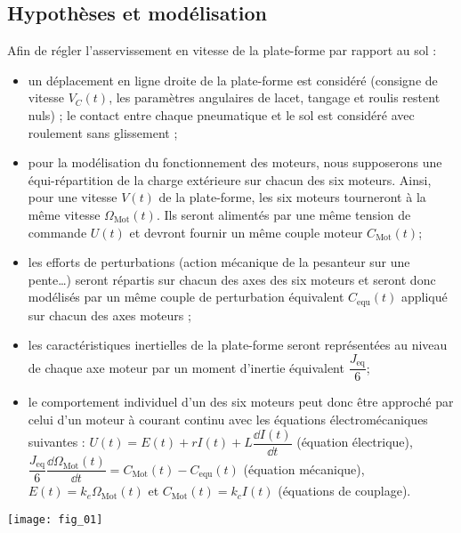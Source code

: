 \begin{multicols}{2}
\subsection*{Hypothèses et modélisation}
Afin de régler l’asservissement en vitesse de la plate-forme par rapport au sol :
\begin{itemize}
\item un déplacement en ligne droite de la plate-forme est considéré (consigne de vitesse $V_C(t)$, les paramètres
angulaires de lacet, tangage et roulis restent nuls) ;
le contact entre chaque pneumatique et le sol est considéré avec roulement sans glissement ;
\item pour la modélisation du fonctionnement des moteurs, nous supposerons une équi-répartition de la charge
extérieure sur chacun des six moteurs. Ainsi, pour une vitesse $V(t)$ de la plate-forme, les six moteurs tourneront à
la même vitesse $\Omega_{\text{Mot}}(t)$. Ils seront alimentés par une même tension de commande $U(t)$ et devront fournir un même couple moteur $C_{\text{Mot}}(t)$;
\item les efforts de perturbations (action mécanique de la pesanteur sur une pente…) seront répartis sur chacun des
axes des six moteurs et seront donc modélisés par un même couple de perturbation équivalent $C_{\text{equ}}(t)$ appliqué
sur chacun des axes moteurs ;
\item les caractéristiques inertielles de la plate-forme seront représentées au niveau de chaque axe moteur par un
moment d’inertie équivalent $\dfrac{J_{\text{eq}}}{6}$;
\item le comportement individuel d’un des six moteurs peut donc être approché par celui d’un moteur à courant continu
avec les équations électromécaniques suivantes : $U(t)=E(t)+rI(t)+L\dfrac{\dd I(t)}{\dd t}$ (équation électrique), 
$\dfrac{J_{\text{eq}}}{6} \dfrac{\dd \Omega_{\text{Mot}}(t)}{\dd t}=C_{\text{Mot}}(t)-C_{\text{equ}}(t)$ (équation mécanique), $E(t)=k_e \Omega_{\text{Mot}}(t)$ et $C_{\text{Mot}}(t)=k_cI(t)$ (équations de couplage).
\end{itemize}

\begin{center}
\texttt{[image: fig\_01]}
\end{center}



\end{multicols}
